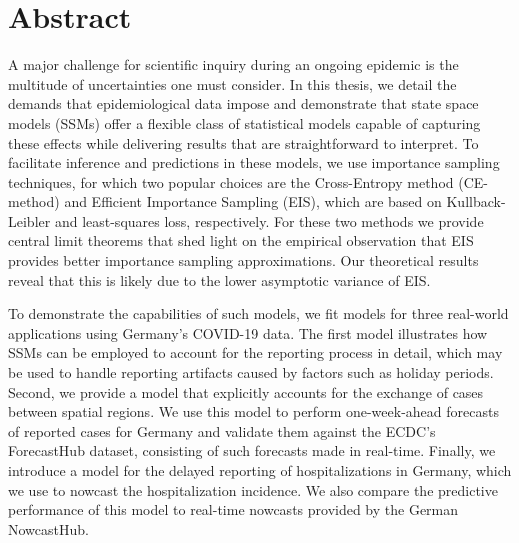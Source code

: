 \begingroup
\let\clearpage\relax
\let\cleardoublepage\relax
\let\cleardoublepage\relax

\chapter*{Abstract}
A major challenge for scientific inquiry during an ongoing epidemic is the multitude of uncertainties one must consider. 
In this thesis, we detail the demands that epidemiological data impose and demonstrate that state space models (SSMs) offer a flexible class of statistical models capable of capturing these effects while delivering results that are straightforward to interpret. 
To facilitate inference and predictions in these models, we use importance sampling techniques, for which two popular choices are the Cross-Entropy method (CE-method) and Efficient Importance Sampling (EIS), which are based on Kullback-Leibler and least-squares loss, respectively. For these two methods we provide central limit theorems that shed light on the empirical observation that EIS provides better importance sampling approximations. Our theoretical results reveal that this is likely due to the lower asymptotic variance of EIS. 

To demonstrate the capabilities of such models, we fit models for three real-world applications using Germany's COVID-19 data. 
The first model illustrates how SSMs can be employed to account for the reporting process in detail, which may be used to handle reporting artifacts caused by factors such as holiday periods.
Second, we provide a model that explicitly accounts for the exchange of cases between spatial regions. We use this model to perform one-week-ahead forecasts of reported cases for Germany and validate them against the ECDC's ForecastHub dataset, consisting of such forecasts made in real-time.
Finally, we introduce a model for the delayed reporting of hospitalizations in Germany, which we use to nowcast the hospitalization incidence. We also compare the predictive performance of this model to real-time nowcasts provided by the German NowcastHub.

\newpage


